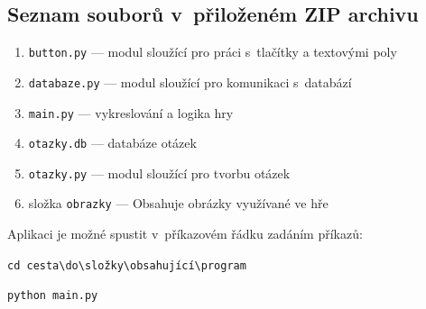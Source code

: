 \documentclass[12pt]{report}
\begin{document}
\nocite{*}
\printbibliography					%
\printglossary[title={Zkratky}]		%
\listoffigures				%
\begin{appendices}
	\chapter*{Seznam souborů v~přiloženém ZIP archivu}	
	\begin{enumerate}
		\item{\texttt{button.py} — modul sloužící pro práci s~tlačítky a textovými poly}
		\item{\texttt{databaze.py} — modul sloužící pro komunikaci s~databází}
		\item{\texttt{main.py} — vykreslování a logika hry}
		\item{\texttt{otazky.db} — databáze otázek}
		\item{\texttt{otazky.py} — modul sloužící pro tvorbu otázek}
		\item{složka \texttt{obrazky} — Obsahuje obrázky využívané ve hře}
	\end{enumerate}
	Aplikaci je možné spustit v~příkazovém řádku zadáním příkazů:
	
	
	 \texttt{cd cesta\textbackslash do\textbackslash složky\textbackslash obsahující\textbackslash program}
	 
	  \texttt{python main.py}
\end{appendices}
\end{document}
